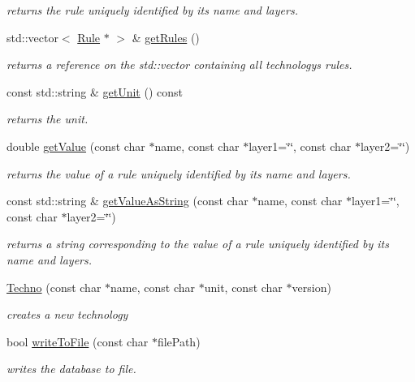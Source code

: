 \begin{DoxyCompactItemize}
\begin{DoxyCompactList}\small\item\em returns the rule uniquely identified by its name and layers. \end{DoxyCompactList}\item 
std\+::vector$<$ \mbox{\hyperlink{class_d_t_r_1_1_rule}{Rule}} $\ast$ $>$ \& \mbox{\hyperlink{class_d_t_r_1_1_techno_ac322d0479195cd8a65ff5a922b7f2af7}{get\+Rules}} ()
\begin{DoxyCompactList}\small\item\em returns a reference on the std\+::vector containing all technology\textquotesingle{}s rules. \end{DoxyCompactList}\item 
\mbox{\label{class_d_t_r_1_1_techno_a42e12e8f890c03ebf12e754d7e489dcb}} 
const std\+::string \& \mbox{\hyperlink{class_d_t_r_1_1_techno_a42e12e8f890c03ebf12e754d7e489dcb}{get\+Unit}} () const
\begin{DoxyCompactList}\small\item\em returns the unit. \end{DoxyCompactList}\item 
double \mbox{\hyperlink{class_d_t_r_1_1_techno_ac08e2e60dd16750551221ca908001057}{get\+Value}} (const char $\ast$name, const char $\ast$layer1=\char`\"{}\char`\"{}, const char $\ast$layer2=\char`\"{}\char`\"{})
\begin{DoxyCompactList}\small\item\em returns the value of a rule uniquely identified by its name and layers. \end{DoxyCompactList}\item 
const std\+::string \& \mbox{\hyperlink{class_d_t_r_1_1_techno_ad5ef5b8e444ab7a86a2e3bff7762c956}{get\+Value\+As\+String}} (const char $\ast$name, const char $\ast$layer1=\char`\"{}\char`\"{}, const char $\ast$layer2=\char`\"{}\char`\"{})
\begin{DoxyCompactList}\small\item\em returns a string corresponding to the value of a rule uniquely identified by its name and layers. \end{DoxyCompactList}\item 
\mbox{\hyperlink{class_d_t_r_1_1_techno_a25c6aecdd011d09618908626192c933f}{Techno}} (const char $\ast$name, const char $\ast$unit, const char $\ast$version)
\begin{DoxyCompactList}\small\item\em creates a new technology \end{DoxyCompactList}\item 
bool \mbox{\hyperlink{class_d_t_r_1_1_techno_a26b05539dd3345963b8708788b82e2cb}{write\+To\+File}} (const char $\ast$file\+Path)
\begin{DoxyCompactList}\small\item\em writes the database to file. \end{DoxyCompactList}\end{DoxyCompactItemize}
